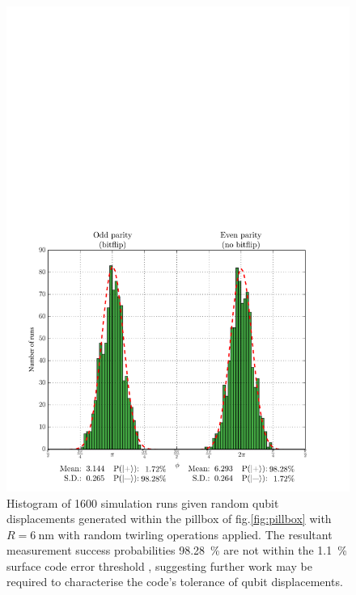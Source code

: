 



\begin{figure}
	\centering
	\includegraphics[width=\columnwidth]{../Figures/Displacement_Histogram.pdf}	
	\caption{Histogram of 1600 simulation runs given random qubit displacements generated within the pillbox of fig.\@ \ref{fig:pillbox} with $R = \SI{6}{\nano\metre}$ with random twirling operations applied. The resultant measurement success probabilities \SI{98.28}{\percent} are not within the \SI{1.1}{\percent} surface code error threshold \cite{Wang2011,Fowler2012}, suggesting further work may be required to characterise the code's tolerance of qubit displacements. }
	\label{fig:DisplacementHistogram}
\end{figure}